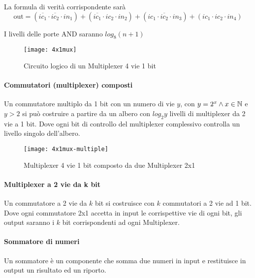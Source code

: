 La formula di verità corrispondente sarà
\[ \text{out} = (\overbar{ic_1} \cdot \overbar{ic_2} \cdot in_1) + (\overbar{ic_1} \cdot ic_2 \cdot in_2) + (ic_1 \cdot \overbar{ic_2} \cdot in_3) + (ic_1\cdot ic_2 \cdot in_4)  \]

I livelli delle porte AND saranno $ log_8(n+1) $

\begin{figure}[H]
	\centering
	\texttt{[image: 4x1mux]}
	\caption{Circuito logico di un Multiplexer 4 vie 1 bit}
\end{figure}

\paragraph{Commutatori (multiplexer) composti}
Un commutatore multiplo da 1 bit con un numero di vie $ y $, con $ y = 2^x \land x \in \mathbb{N} $ e $ y > 2 $ si può costruire a partire da un albero con $ log_2y $ livelli di multiplexer da 2 vie a 1 bit. Dove ogni bit di controllo del multiplexer complessivo controlla un livello singolo dell'albero.

\begin{figure}[H]
	\centering
	\texttt{[image: 4x1mux-multiple]}
	\caption{Multiplexer 4 vie 1 bit composto da due Multiplexer 2x1}
\end{figure}

\paragraph{Multiplexer a 2 vie da k bit}

Un commutatore a 2 vie da $ k $ bit si costruisce con $ k $ commutatori a 2 vie ad 1 bit. Dove ogni commutatore 2x1 accetta in input le corrispettive vie di ogni bit, gli output saranno i $ k $ bit corrispondenti ad ogni Multiplexer.



\paragraph{Sommatore di numeri}
Un sommatore è un componente che somma due numeri in input e restituisce in output un risultato ed un riporto.

